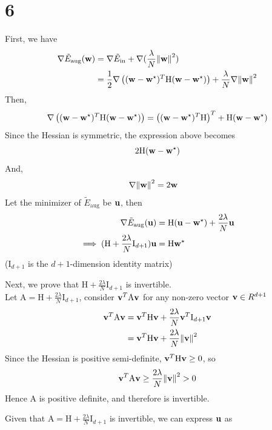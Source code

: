 \documentclass[11pt]{article}
\let\mathbb\relax
\theoremstyle{definition}
\begin{document}
\section*{6}
First, we have
\begin{align*}
  \nabla\tilde{E}_\text{aug}(\vb{w}) &= \nabla\tilde{E}_\text{in} + \nabla(\frac{\lambda}{N}\norm{\vb{w}}^2) \\ 
  &= \frac{1}{2}\nabla\left((\vb{w} - \vb{w}^\star)^T\text{H}(\vb{w} - \vb{w}^\star)\right) + \frac{\lambda}{N}\nabla\norm{\vb{w}}^2
\end{align*}
Then,
\[
  \nabla\left((\vb{w} - \vb{w}^\star)^T\text{H}(\vb{w} - \vb{w}^\star)\right) = \left((\vb{w} - \vb{w}^\star)^T\text{H}\right)^T + \text{H}(\vb{w} - \vb{w}^\star)
\]
Since the Hessian is symmetric, the expression above becomes
\[
   2\text{H}(\vb{w} - \vb{w}^\star)
\]
And,
\begin{align*}
  \nabla\norm{\vb{w}}^2 &= 2\vb{w}
\end{align*}
Let the minimizer of $\tilde{E}_\text{aug}$ be $\vb{u}$, then
\begin{align*}
  \nabla\tilde{E}_\text{aug}(\vb{u}) &= \text{H}(\vb{u} - \vb{w}^\star) + \frac{2\lambda}{N}\vb{u} \\ 
  \implies (\text{H} + \frac{2\lambda}{N}\text{I}_{d + 1})\vb{u} &= \text{H}\vb{w}^\star
\end{align*}
($\text{I}_{d + 1}$ is the $d + 1$-dimension identity matrix) \\
\par
Next, we prove that $\text{H} + \frac{2\lambda}{N}\text{I}_{d + 1}$ is invertible. \\ 
Let $\text{A} = \text{H} + \frac{2\lambda}{N}\text{I}_{d + 1}$, consider $\vb{v}^T\text{A}\vb{v}$ for any non-zero vector $\vb{v} \in \mathbb{R}^{d + 1}$
\begin{align*}
  \vb{v}^T\text{A}\vb{v} &= \vb{v}^T\text{H}\vb{v} + \frac{2\lambda}{N}\vb{v}^T\text{I}_{d + 1}\vb{v} \\ 
  &= \vb{v}^T\text{H}\vb{v} + \frac{2\lambda}{N}\norm{\vb{v}}^2
\end{align*}
Since the Hessian is positive semi-definite, $\vb{v}^T\text{H}\vb{v} \geq 0$, so 
\begin{align*}
  \vb{v}^T\text{A}\vb{v} \geq \frac{2\lambda}{N}\norm{\vb{v}}^2 > 0
\end{align*}
Hence $\text{A}$ is positive definite, and therefore is invertible.\\
\par 
Given that $\text{A} = \text{H} + \frac{2\lambda}{N}\text{I}_{d + 1}$ is invertible, we can express $\vb{u}$ as
\end{document}
